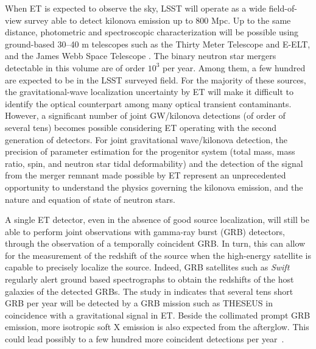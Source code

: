 When ET is expected to observe the sky, LSST will operate as a wide field-of-view survey able to detect kilonova emission up to 800 Mpc. 
Up to the same distance, photometric and spectroscopic characterization will be possible using ground-based 30--40 m telescopes such as the Thirty Meter Telescope \citep[TMT,][]{Skidmore2015} and E-ELT, and the James Webb Space Telescope \citep[JWST,][]{Gardner2006}.  The binary neutron star mergers detectable in this volume are of order $10^3$ per year. Among them, a few hundred are expected to be in the LSST surveyed field. For the majority of these sources, the gravitational-wave localization uncertainty by ET will make it difficult to identify the optical counterpart among many optical transient contaminants. However, a significant number of joint GW/kilonova detections (of order of several tens) becomes possible considering ET operating with the second generation of detectors. For joint gravitational wave/kilonova detection, the precision of parameter estimation for the progenitor system (total mass, mass ratio, spin, and neutron star tidal deformability) and the detection of the signal from the merger remnant made possible by ET represent an unprecedented opportunity to understand the physics governing the kilonova emission, and the nature and equation of state of neutron stars.



A single ET detector, even in the absence of good source localization, will still be able to perform joint observations with gamma-ray burst (GRB) detectors, through  the observation of a temporally coincident GRB. In turn, this  can  allow for the measurement of the redshift of the source when the high-energy satellite is capable to precisely  localize the source. Indeed, GRB satellites such as \emph{Swift} regularly alert ground based spectrographs to obtain the redshifts of the host galaxies of the detected GRBs. The study in
\cite{Stratta:2017bwq,Belgacem:2019tbw} indicates that several tens  short GRB  per year will be detected by a GRB mission such as THESEUS in coincidence with a gravitational signal in ET. Beside the collimated prompt GRB emission, more isotropic soft X emission is also expected from the afterglow. This could lead  possibly to a few hundred more coincident detections per year~\cite{Stratta:2017bwq}. 

